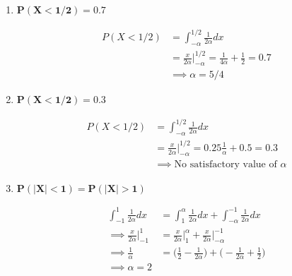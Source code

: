 \documentclass[10pt, oneside]{article}
\begin{document}
\begin{enumerate}[label=4.\arabic*]
\begin{enumerate}
	\begin{align*}
	P(X > 1) &= \int^\alpha_1 \frac{1}{2\alpha} dx \\
	&= \frac{x}{2 \alpha} \Big|^\alpha_1 = \frac{\alpha}{2\alpha} - \frac{1}{2\alpha} = 1/2\\
	&\implies \boxed{\text{No satisfactory value of }\alpha}
	\end{align*}
	
	\item  \begin{tcolorbox}[
	  colback=Cerulean!5!white,
	  colframe=Cerulean!75!black]
	\textbf{$\bm{P(X < 1/2) = 0.7}$}
	\end{tcolorbox}
	
	\begin{align*}
	P(X < 1/2) &= \int^{1/2}_{-\alpha} \frac{1}{2\alpha} dx \\
	&= \frac{x}{2\alpha} \Big|^{1/2}_{-\alpha} = \frac{1}{4\alpha} + \frac{1}{2} = 0.7 \\
	&\implies \boxed{\alpha = 5/4}
	\end{align*}
	
	\item  \begin{tcolorbox}[
	  colback=Cerulean!5!white,
	  colframe=Cerulean!75!black]
	\textbf{$\bm{P(X < 1/2) = 0.3}$}
	\end{tcolorbox}
	
	\begin{align*}
	P(X < 1/2) &= \int^{1/2}_{-\alpha} \frac{1}{2\alpha} dx \\
	&= \frac{x}{2\alpha} \Big|^{1/2}_{-\alpha} = 0.25 \frac{1}{\alpha} + 0.5 = 0.3 \\
	&\implies \boxed{\text{No satisfactory value of }\alpha}
	\end{align*}
	
	\item  \begin{tcolorbox}[
	  colback=Cerulean!5!white,
	  colframe=Cerulean!75!black]
	\textbf{$\bm{P(|X| < 1) = P(|X| > 1)}$}
	\end{tcolorbox}
	
	\begin{align*}
	\int^1_{-1} \frac{1}{2\alpha} dx &= \int^\alpha_1 \frac{1}{2\alpha} dx + \int^{-1}_{-\alpha} \frac{1}{2\alpha} dx \\
	\implies \frac{x}{2\alpha} \Big|^1_{-1} &= \frac{x}{2\alpha} \Big|^\alpha_1 + \frac{x}{2\alpha} \Big|^{-1}_{-\alpha} \\
	\implies \frac{1}{\alpha} &= \Bigg( \frac{1}{2} - \frac{1}{2\alpha} \Bigg) + \Bigg( -\frac{1}{2\alpha} + \frac{1}{2} \Bigg) \\
	\implies \boxed{\alpha = 2}
	\end{align*}
	

\end{enumerate}
\end{enumerate}
\end{document}
